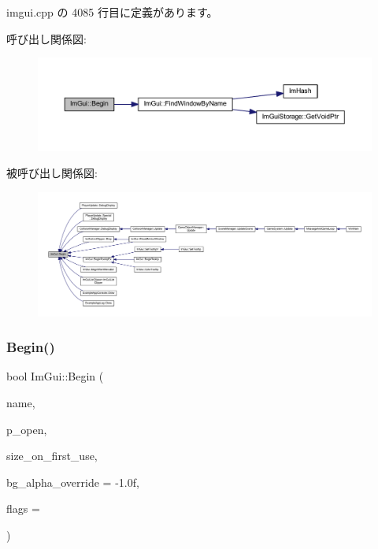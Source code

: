  imgui.\+cpp の 4085 行目に定義があります。

呼び出し関係図\+:\nopagebreak
\begin{figure}[H]
\begin{center}
\leavevmode
\includegraphics[width=350pt]{namespace_im_gui_a581e58db0bc930bafa4a5d23093a2b99_cgraph}
\end{center}
\end{figure}
被呼び出し関係図\+:
\nopagebreak
\begin{figure}[H]
\begin{center}
\leavevmode
\includegraphics[width=350pt]{namespace_im_gui_a581e58db0bc930bafa4a5d23093a2b99_icgraph}
\end{center}
\end{figure}
\mbox{\label{namespace_im_gui_a288e01ff1c8102d6374a6b1e409b9878}} 
\subsubsection{\texorpdfstring{Begin()}{Begin()}\hspace{0.1cm}{\footnotesize\ttfamily [2/2]}}
{\footnotesize\ttfamily bool Im\+Gui\+::\+Begin (\begin{DoxyParamCaption}\item[{const char $\ast$}]{name,  }\item[{bool $\ast$}]{p\+\_\+open,  }\item[{const \mbox{\hyperlink{struct_im_vec2}{Im\+Vec2}} \&}]{size\+\_\+on\+\_\+first\+\_\+use,  }\item[{float}]{bg\+\_\+alpha\+\_\+override = {\ttfamily -\/1.0f},  }\item[{\mbox{\hyperlink{imgui_8h_a0b8e067ab4f7a818828c8d89e531addc}{Im\+Gui\+Window\+Flags}}}]{flags = {} }\end{DoxyParamCaption})}



